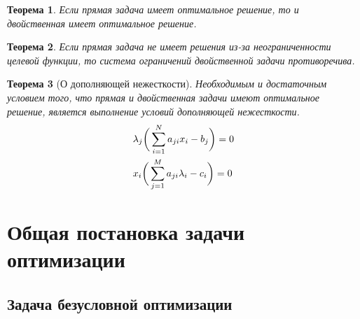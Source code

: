 \documentclass[12pt]{article}
\newtheorem{theorem}{Теорема}[section]
\theoremstyle{definition}
\theoremstyle{remark}
\begin{document}
\begin{theorem}
Если прямая задача имеет оптимальное решение, то и двойственная имеет оптимальное решение.
\end{theorem}

\begin{theorem}
Если прямая задача не имеет решения из-за неограниченности целевой функции, то система ограничений двойственной задачи противоречива.
\end{theorem}

\begin{theorem}[О дополняющей нежесткости]
Необходимым и достаточным условием того, что прямая и двойственная задачи имеют оптимальное решение, является выполнение условий дополняющей нежесткости.
\begin{align}
  &\lambda_j\bigg(\sum_{i=1}^N a_{ji}x_i-b_j\bigg)=0\\
  &x_i\bigg(\sum_{j=1}^M a_{ji}\lambda_i-c_i\bigg)=0\notag
\end{align}
\end{theorem}

\section{Общая постановка задачи оптимизации}
\subsection{Задача безусловной оптимизации}
\end{document}
